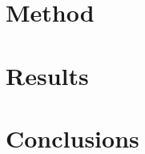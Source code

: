 \documentclass[a4paper]{report}
\begin{document}
\chapter{Method}
\label{ch:method}

\chapter{Results}
\label{ch:results}

\chapter{Conclusions}
\label{ch:conc}

\nocite{*}




\end{document}
